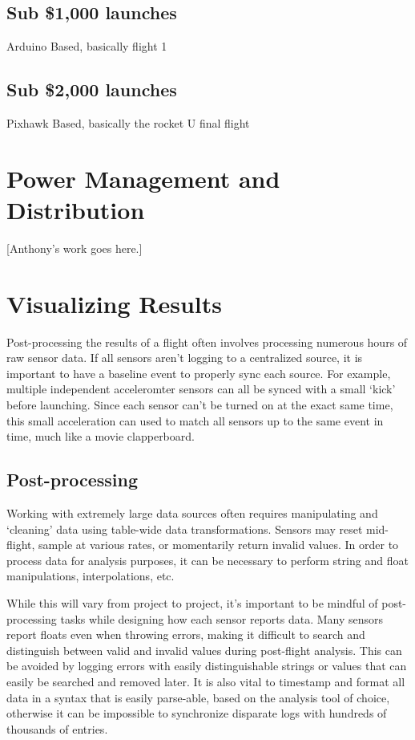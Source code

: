 \documentclass[heading.tex]{subfiles}
\begin{document}
\subsection{Sub \$1,000 launches}

Arduino Based, basically flight 1

\subsection{Sub \$2,000 launches}

Pixhawk Based, basically the rocket U final flight

\section{Power Management and Distribution}

[Anthony's work goes here.]

\section{Visualizing Results}

Post-processing the results of a flight often involves processing numerous
hours of raw sensor data. If all sensors aren't logging to a centralized source,
it is important to have a baseline event to properly sync each source. For
example, multiple independent acceleromter sensors can all be synced with a
small `kick' before launching. Since each sensor can't be turned on at the exact
same time, this small acceleration can used to match all sensors up to the same
event in time, much like a movie clapperboard.

\subsection{Post-processing}

Working with extremely large data sources often requires manipulating and
`cleaning' data using table-wide data transformations. Sensors may reset
mid-flight, sample at various rates, or momentarily return invalid values.
In order to process data for analysis purposes, it can be necessary to perform
string and float manipulations, interpolations, etc.

While this will vary from project to project, it's important to be mindful of
post-processing tasks while designing how each sensor reports data.
Many sensors report floats even when throwing errors, making it difficult to
search and distinguish between valid and invalid values during post-flight
analysis. This can be avoided by logging errors with easily distinguishable
strings or values that can easily be searched and removed later. It is also
vital to timestamp and format all data in a syntax that is easily parse-able,
based on the analysis tool of choice, otherwise it can be
impossible to synchronize disparate logs with hundreds of thousands of entries.
\end{document}
